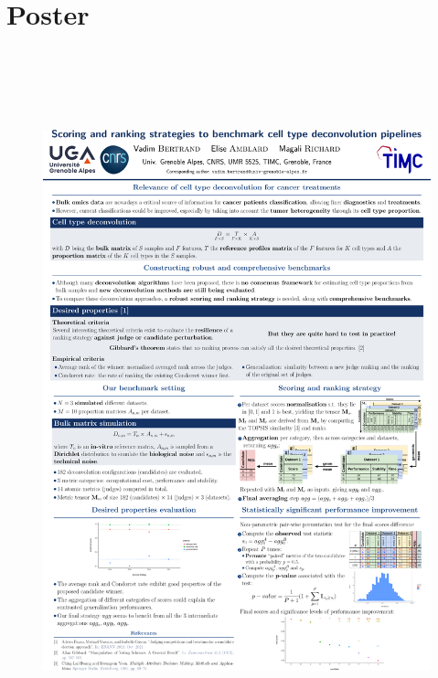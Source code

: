 \documentclass{article}
\begin{document}
\section{Poster}\label{app:poster}
\begin{figure}[h!]
    \centering
    \includegraphics[height=20.3cm,keepaspectratio]{fig/poster.png}
\end{figure}
\setlength{\footskip}{0pt}
\end{document}
